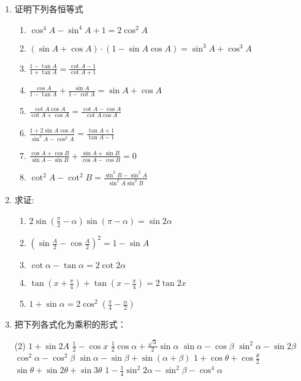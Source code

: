 \begin{enumerate}
\item 证明下列各恒等式
\begin{enumerate}
    \item $\cos ^{4} A-\sin ^{4} A+1=2 \cos ^{2} A$
    \item $(\sin A+\cos A) \cdot(1-\sin A \cos A)=\sin ^{3} A+\cos ^{3} A$
    \item $\frac{1-\tan A}{1+\tan A}=\frac{\cot A-1}{\cot A+1}$
    \item $\frac{\cos A}{1-\tan A}+\frac{\sin A}{1-\cot A}=\sin A+\cos A$
    \item $\frac{\cot A \cos A}{\cot A+\cos A}=\frac{\cot A-\cos A}{\cot A \cos A}$
    \item $\frac{1+2 \sin A \cos A}{\sin ^{2} A-\cos ^{2} A}=\frac{\tan A+1}{\tan A-1}$
    \item $\frac{\cos A+\cos B}{\sin A-\sin B}+\frac{\sin A+\sin B}{\cos A-\cos B}=0$
    \item $\cot^{2} A-\cot^{2} B=\frac{\sin ^{2} B-\sin ^{2} A}{\sin ^{2} A \sin ^{2} B}$
\end{enumerate}

\item 求证:
\begin{enumerate}
    \item $2 \sin \left(\frac{\pi}{2}-\alpha\right) \sin (\pi-\alpha)=\sin 2 \alpha$
    \item $\left(\sin \frac{A}{2}-\cos \frac{A}{2}\right)^{2}=1-\sin A$
    \item $\cot \alpha-\tan \alpha=2 \cot 2 \alpha$
\item $\tan\left(x+\frac{\pi}{4}\right)+\tan\left(x-\frac{\pi}{4}\right)=2\tan 2x$
\item $1+\sin\alpha=2\cos^2\left(\frac{\pi}{4}-\frac{\alpha}{2}\right)$
\end{enumerate}

\item 把下列各式化为乘积的形式：
\begin{tasks}(2)
    \task $1+\sin 2A$
    \task $\frac{1}{2}-\cos x$
    \task $\frac{1}{2}\cos\alpha+\frac{\sqrt{3}}{2}\sin\alpha$
    \task $\sin\alpha-\cos\beta$
    \task $\sin^2\alpha-\sin2\beta$
    \task $\cos^2\alpha-\cos^2\beta$
    \task $\sin\alpha-\sin\beta+\sin(\alpha+\beta)$
    \task $1+\cos\theta+\cos\frac{\theta}{2}$
    \task $\sin\theta+\sin2\theta+\sin3\theta$
    \task $1-\frac{1}{4}\sin^2 2\alpha-\sin^2\beta-\cos^4\alpha$
\end{tasks}


\end{enumerate}
